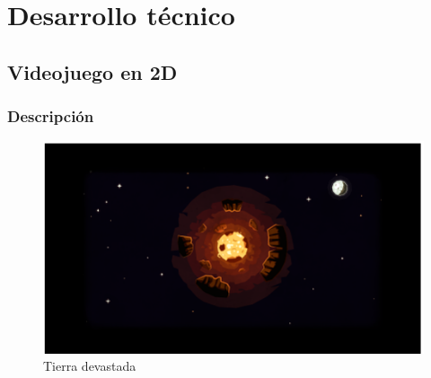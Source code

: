 

\chapter{Desarrollo técnico}
\section{Videojuego en 2D}
\subsection{Descripción}

\begin{figure}[H]
	\centering
	\includegraphics[scale=0.80]{imagenes/terraDevastada.png}
	\caption{\label{fig:TierraDevastada}Tierra devastada}
\end{figure}


 






